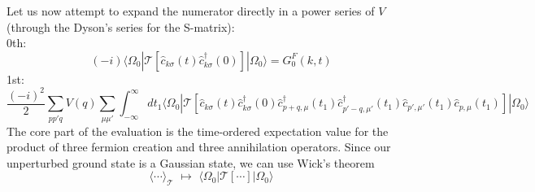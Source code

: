 Let us now attempt to expand the numerator directly in a power series of $V$ (through the Dyson's series for the S-matrix):\\
0th:
\[ \left( -i \right) \langle \Omega _0|\mathcal{T} \left[ \hat{c}_{k\sigma}\left( t \right) \hat{c}_{k\sigma}^{\dagger}\left( 0 \right) \right] |\Omega _0\rangle =G_{0}^{F}\left( k,t \right)\]
1st:
\[ \frac{\left( -i \right) ^2}{2}\sum_{pp'q}{V\left( q \right) \sum_{\mu \mu '}{\int_{-\infty}^{\infty}{dt_1\langle \Omega _0|\mathcal{T} \left[ \hat{c}_{k\sigma}\left( t \right) \hat{c}_{k\sigma}^{\dagger}\left( 0 \right) \hat{c}_{p+q,\mu}^{\dagger}\left( t_1 \right) \hat{c}_{p'-q,\mu '}^{\dagger}\left( t_1 \right) \hat{c}_{p',\mu '}\left( t_1 \right) \hat{c}_{p,\mu}\left( t_1 \right) \right] |\Omega _0\rangle}}}\]
The core part of the evaluation is the time-ordered expectation value for the product of three fermion creation and three annihilation operators. Since our unperturbed ground state is a Gaussian state, we can use Wick's theorem
\[ \langle \cdots \rangle _{\mathcal{T}}\,\,\mapsto \,\,\langle \Omega _0|\mathcal{T} \left[ \cdots \right] |\Omega _0\rangle \]
